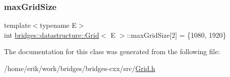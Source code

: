 \subsubsection{\texorpdfstring{max\+Grid\+Size}{maxGridSize}}
{\footnotesize\ttfamily template$<$typename E$>$ \\
int \hyperlink{classbridges_1_1datastructure_1_1_grid}{bridges\+::datastructure\+::\+Grid}$<$ E $>$\+::max\+Grid\+Size\mbox{[}2\mbox{]} = \{1080, 1920\}\hspace{0.3cm}{\ttfamily [protected]}}



The documentation for this class was generated from the following file\+:\begin{DoxyCompactItemize}
\item 
/home/erik/work/bridges/bridges-\/cxx/src/\hyperlink{_grid_8h}{Grid.\+h}\end{DoxyCompactItemize}
